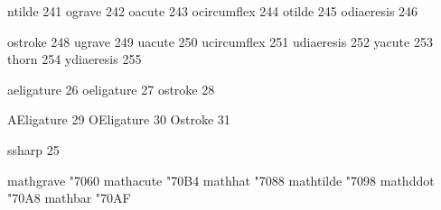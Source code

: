  ntilde            241
 ograve            242
 oacute            243
 ocircumflex       244
 otilde            245
 odiaeresis        246

 ostroke           248
 ugrave            249
 uacute            250
 ucircumflex       251
 udiaeresis        252
 yacute            253
 thorn             254
 ydiaeresis        255


 aeligature         26
 oeligature         27
 ostroke            28

 AEligature         29 
 OEligature         30 
 Ostroke            31

 ssharp             25

\stopencoding


\startencoding[texnansi]

 mathgrave       "7060 
 mathacute       "70B4 
 mathhat         "7088 
 mathtilde       "7098 
 mathddot        "70A8 
 mathbar         "70AF 

\stopencoding

\endinput

% 
% 
% 
% 
